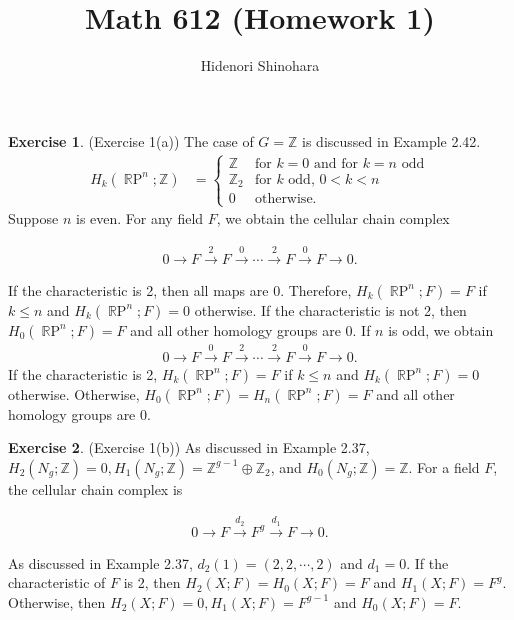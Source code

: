 \documentclass[12pt, psamsfonts]{amsart}
\theoremstyle{definition}
\newtheorem*{exer}{Exercise}
\theoremstyle{remark}
\DeclareMathOperator{\RP}{\mathbb{R}P}
\numberwithin{equation}{section}
\begin{document}
\title{Math 612 (Homework 1)}
\author{Hidenori Shinohara}
\maketitle

\begin{exer}{(Exercise 1(a))}
  The case of $G = \mathbb{Z}$ is discussed in Example 2.42.
  \begin{align*}
    H_k(\RP^n; \mathbb{Z}) &= \begin{cases}
      \mathbb{Z} & \text{for $k = 0$ and for $k = n$ odd} \\
      \mathbb{Z}_2 & \text{for $k$ odd, $0 < k < n$} \\
      0 & \text{otherwise}.
    \end{cases}
  \end{align*}
  Suppose $n$ is even.
  For any field $F$, we obtain the cellular chain complex

  \begin{align*}
    0 \rightarrow F \xrightarrow{2} F \xrightarrow{0} \cdots \xrightarrow{2} F \xrightarrow{0} F \rightarrow 0.
  \end{align*}

  If the characteristic is 2, then all maps are 0.
  Therefore, $H_k(\RP^n; F) = F$ if $k \leq n$ and $H_k(\RP^n; F) = 0$ otherwise.
  If the characteristic is not 2, then $H_0(\RP^n; F) = F$ and all other homology groups are 0.
  If $n$ is odd, we obtain
  \begin{align*}
    0 \rightarrow F \xrightarrow{0} F \xrightarrow{2} \cdots \xrightarrow{2} F \xrightarrow{0} F \rightarrow 0.
  \end{align*}
  If the characteristic is 2, $H_k(\RP^n; F) = F$ if $k \leq n$ and $H_k(\RP^n; F) = 0$ otherwise.
 Otherwise, $H_0(\RP^n; F) = H_n(\RP^n; F) = F$ and all other homology groups are 0.
\end{exer}

\begin{exer}{(Exercise 1(b))}
  As discussed in Example 2.37, $H_2(N_g; \mathbb{Z}) = 0, H_1(N_g; \mathbb{Z}) = \mathbb{Z}^{g - 1} \oplus \mathbb{Z}_2$, and $H_0(N_g; \mathbb{Z}) = \mathbb{Z}$.
  For a field $F$, the cellular chain complex is

  \begin{align*}
    0 \rightarrow F \xrightarrow{d_2} F^g \xrightarrow{d_1} F \rightarrow 0.
  \end{align*}

  As discussed in Example 2.37, $d_2(1) = (2, 2, \cdots, 2)$ and $d_1 = 0$.
  If the characteristic of $F$ is 2, then $H_2(X; F) = H_0(X; F) = F$ and $H_1(X; F) = F^g$.
  Otherwise, then $H_2(X; F) = 0, H_1(X; F) = F^{g - 1}$ and $H_0(X; F) = F$.
\end{exer}
\end{document}
